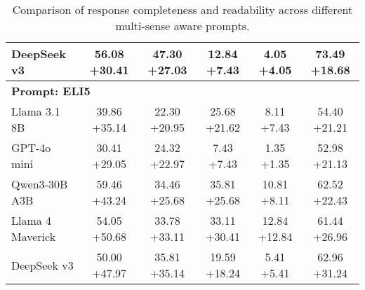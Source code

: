 \documentclass{article}%
\begin{document}
\begin{table}[h!]
\begin{tabular}{@{}l c c c c c@{}}
DeepSeek v3&56.08 \textcolor{own_green}{+30.41}&47.30 \textcolor{own_green}{+27.03}&12.84 \textcolor{own_green}{+7.43}&4.05 \textcolor{own_green}{+4.05}&73.49 \textcolor{own_green}{+18.68}\\%
\midrule%
\multicolumn{6}{l}{\textbf{Prompt: ELI5}} \\%
Llama 3.1 8B&39.86 \textcolor{own_green}{+35.14}&22.30 \textcolor{own_green}{+20.95}&25.68 \textcolor{own_green}{+21.62}&8.11 \textcolor{own_green}{+7.43}&54.40 \textcolor{own_green}{+21.21}\\%
GPT{-}4o mini&30.41 \textcolor{own_green}{+29.05}&24.32 \textcolor{own_green}{+22.97}&7.43 \textcolor{own_green}{+7.43}&1.35 \textcolor{own_green}{+1.35}&52.98 \textcolor{own_green}{+21.13}\\%
Qwen3{-}30B A3B&59.46 \textcolor{own_green}{+43.24}&34.46 \textcolor{own_green}{+25.68}&35.81 \textcolor{own_green}{+25.68}&10.81 \textcolor{own_green}{+8.11}&62.52 \textcolor{own_green}{+22.43}\\%
Llama 4 Maverick&54.05 \textcolor{own_green}{+50.68}&33.78 \textcolor{own_green}{+33.11}&33.11 \textcolor{own_green}{+30.41}&12.84 \textcolor{own_green}{+12.84}&61.44 \textcolor{own_green}{+26.96}\\%
DeepSeek v3&50.00 \textcolor{own_green}{+47.97}&35.81 \textcolor{own_green}{+35.14}&19.59 \textcolor{own_green}{+18.24}&5.41 \textcolor{own_green}{+5.41}&62.96 \textcolor{own_green}{+31.24}\\\bottomrule%
%
\end{tabular}%
\caption{Comparison of response completeness and readability across different multi{-}sense aware prompts.}%
\end{table}

%
\end{document}
